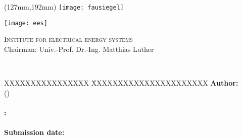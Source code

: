 \begin{titlepage}
	\thispagestyle{empty}

	\begin{textblock*}{\textwidth}(127mm,192mm)
	\texttt{[image: fausiegel]}
	\end{textblock*}

	\begin{minipage}[]{47mm}
		\texttt{[image: ees]}
	\end{minipage}
	\begin{minipage}[]{.7\textwidth}
		\raggedleft
		\textsc{Institute for electrical energy systems}\\ %
		Chairman: Univ.-Prof. Dr.-Ing. Matthias Luther
	\end{minipage}
	
	\vspace{65mm}

	{\centering
	
	\large{\arbeit} \\	
	\Large{\textbf{\titel}}
	
	\par}
	
	\vspace{105mm}
	\vfill
	
	{\raggedright
	\begin{tabbing}
		XXXXXXXXXXXXXXXX \= XXXXXXXXXXXXXXXXXXXXXX \kill
		\textbf{Author:} 	\> \href{mailto:maximilian.koehler@fau.de}{\autor} \\
							\> (\matrikelnr)		\\
													\>									\\
		\textbf{\langdbbetreuer:}		\> \betreuer \\
													\>									\\
		\textbf{Submission date:}	\> \datumAbgabe															
	\end{tabbing}
	\par}
\end{titlepage}
